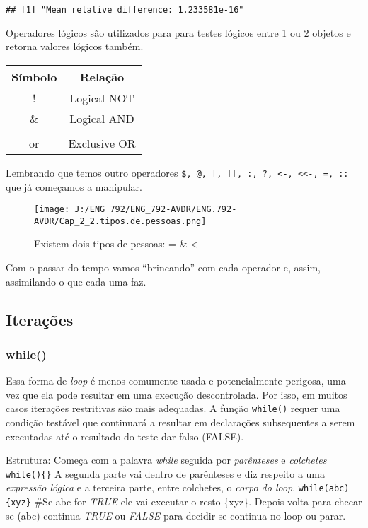 \documentclass[
]{book}
\begin{document}
\begin{verbatim}
## [1] "Mean relative difference: 1.233581e-16"
\end{verbatim}

Operadores lógicos são utilizados para para testes lógicos entre 1 ou 2 objetos e retorna valores lógicos também.

\begin{longtable}[]{@{}cc@{}}
\toprule
Símbolo & Relação \\
\midrule
\endhead
! & Logical NOT \\
\& & Logical AND \\
& \\
or & Exclusive OR \\
\bottomrule
\end{longtable}

Lembrando que temos outro operadores \texttt{\$,\ @,\ {[},\ {[}{[},\ :,\ ?,\ \textless{}-,\ \textless{}\textless{}-,\ =,\ ::} que já começamos a manipular.

\begin{figure}
\centering
\texttt{[image: J:/ENG 792/ENG\_792-AVDR/ENG.792-AVDR/Cap\_2\_2.tipos.de.pessoas.png]}
\caption{Existem dois tipos de pessoas: = \& \textless-}
\end{figure}

Com o passar do tempo vamos ``brincando'' com cada operador e, assim, assimilando o que cada uma faz.

\hypertarget{iterauxe7uxf5es}{%
\subsection{Iterações}\label{iterauxe7uxf5es}}

\hypertarget{while}{%
\subsubsection{while()}\label{while}}

Essa forma de \emph{loop} é menos comumente usada e potencialmente perigosa, uma vez que ela pode resultar em uma execução descontrolada. Por isso, em muitos casos iterações restritivas são mais adequadas.
A função \texttt{while()} requer uma condição testável que continuará a resultar em declarações subsequentes a serem executadas até o resultado do teste dar falso (FALSE).

Estrutura:
Começa com a palavra \emph{while} seguida por \emph{parênteses} e \emph{colchetes} \texttt{while()\{\}}
A segunda parte vai dentro de parênteses e diz respeito a uma \emph{expressão lógica} e a terceira parte, entre colchetes, o \emph{corpo do loop}.
\texttt{while(abc)\{xyz\}} \#Se abc for \emph{TRUE} ele vai executar o resto \{xyz\}. Depois volta para checar se (abc) continua \emph{TRUE} ou \emph{FALSE} para decidir se continua no loop ou parar.
\end{document}

